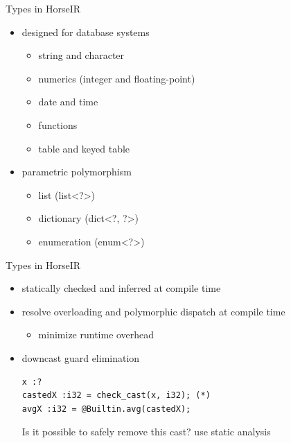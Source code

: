 \documentclass{beamer}
\begin{document}
\begin{frame}{Types in HorseIR}
\begin{itemize}
    \item designed for database systems
          \begin{itemize}
          \item string and character
          \item numerics (integer and floating-point)
          \item date and time
          \item functions
          \item table and keyed table
          \end{itemize}
    \item parametric polymorphism
          \begin{itemize}
          \item list (list<?>)
          \item dictionary (dict<?, ?>)
          \item enumeration (enum<?>)
          \end{itemize}
\end{itemize}
\end{frame}

\begin{frame}[fragile]{Types in HorseIR}
\begin{itemize}
    \item statically checked and inferred at compile time
    \item resolve overloading and polymorphic dispatch at compile time
          \begin{itemize}
          \item minimize runtime overhead
          \end{itemize}
    \item downcast guard elimination
          \begin{lstlisting}
x :?
castedX :i32 = check_cast(x, i32); (*)
avgX :i32 = @Builtin.avg(castedX);    
          \end{lstlisting}
          Is it possible to safely remove this cast? use static analysis
\end{itemize}
\end{frame}
\end{document}
